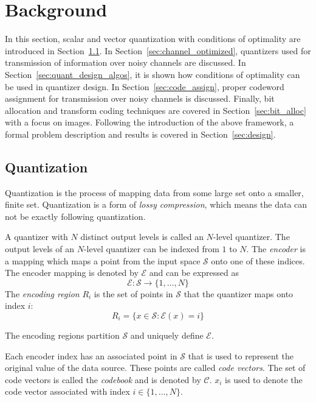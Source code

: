 \documentclass[10pt]{article}
\begin{document}
\section{Background}
\label{sec:background}
In this section, scalar and vector quantization with conditions of optimality are introduced in Section~\ref{sec:quantization}. In Section~\ref{sec:channel_optimized}, quantizers used for transmission of information over noisy channels are discussed. In Section~\ref{sec:quant_design_algos}, it is shown how conditions of optimality can be used in quantizer design. In Section~\ref{sec:code_assign}, proper codeword assignment for transmission over noisy channels is discussed. Finally, bit allocation and transform coding techniques are covered in Section~\ref{sec:bit_alloc} with a focus on images. Following the introduction of the above framework, a formal problem description and results is covered in Section~\ref{sec:design}.

\subsection{Quantization}
\label{sec:quantization}
Quantization is the process of mapping data from some large set onto a smaller, finite set. Quantization is a form of \emph{lossy compression}, which means the data can not be exactly following quantization.

A quantizer with $N$ distinct output levels is called an $N$-level quantizer. The output levels of an $N$-level quantizer can be indexed from $1$ to $N$. The \emph{encoder} is a mapping which maps a point from the input space $\mathcal{S}$ onto one of these indices. The encoder mapping is denoted by $\mathcal{E}$ and can be expressed as
\begin{equation}
\mathcal{E} : \mathcal{S} \rightarrow \{1,\ldots,N\}
\end{equation}
The \emph{encoding region} $R_i$ is the set of points in $\mathcal{S}$ that the quantizer maps onto index $i$:
\begin{equation}
R_i = \{x \in \mathcal{S} : \mathcal{E}(x) = i\}
\end{equation}

The encoding regions partition $\mathcal{S}$ and uniquely define $\mathcal{E}$.

Each encoder index has an associated point in $\mathcal{S}$ that is used to represent the original value of the data source. These points are called \emph{code vectors}. The set of code vectors is called the \emph{codebook} and is denoted by $\mathcal{C}$. $x_i$ is used to denote the code vector associated with index $i \in \{1,\ldots,N\}$.
\end{document}
